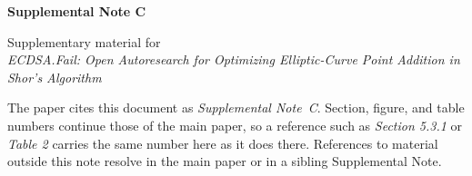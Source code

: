 \documentclass[envcountsame,runningheads,notitlepage]{llncs}
\begin{document}
\begin{center}
  {\large\bfseries Supplemental Note C\par}
  \vspace{0.9em}
  {\small Supplementary material for\\[0.25em]
   \emph{ECDSA.Fail: Open Autoresearch for Optimizing Elliptic-Curve Point Addition in Shor's Algorithm}\\[1.0em]
   \begin{minipage}{0.86\linewidth}\small\itshape\raggedright
   The paper cites this document as \emph{Supplemental Note~C}.
   Section, figure, and table numbers continue those of the main paper, so a
   reference such as \emph{Section 5.3.1} or \emph{Table 2} carries the same
   number here as it does there. References to material outside this note
   resolve in the main paper or in a sibling Supplemental Note.
   \end{minipage}\par}
\end{center}
\vspace{1.5em}
\appendix
\setcounter{table}{7}
\setcounter{section}{2}



\end{document}
